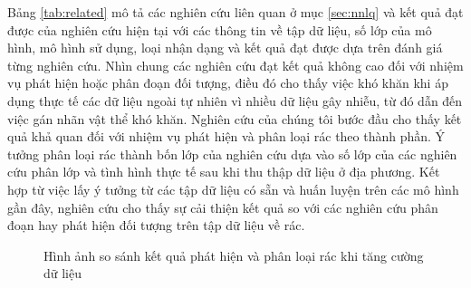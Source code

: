 \documentclass[../the.tex]{subfiles}
\begin{document}
{\fontsize{13}{12} \selectfont

Bảng \ref{tab:related}
mô tả các nghiên cứu liên quan ở mục \ref{sec:nnlq} và kết quả đạt được của nghiên cứu hiện tại với các thông tin về tập dữ liệu, số lớp của mô hình, mô hình sử dụng, loại nhận dạng và kết quả đạt được dựa trên đánh giá từng nghiên cứu.
Nhìn chung các nghiên cứu đạt kết quả không cao đối với nhiệm vụ phát hiện hoặc phân đoạn đối tượng, điều đó cho thấy việc khó khăn khi áp dụng thực tế các dữ liệu ngoài tự nhiên vì nhiều dữ liệu gây nhiễu,
từ đó dẫn đến việc gán nhãn vật thể khó khăn.
Nghiên cứu của chúng tôi bước đầu cho thấy kết quả khả quan đối với nhiệm vụ phát hiện và phân loại rác theo thành phần.
Ý tưởng phân loại rác thành bốn lớp của nghiên cứu dựa vào số lớp của các nghiên cứu phân lớp và tình hình thực tế sau khi thu thập dữ liệu ở địa phương. Kết hợp từ việc lấy ý tưởng từ các tập dữ liệu có sẵn và huấn luyện trên các mô hình gần đây,
nghiên cứu cho thấy sự cải thiện kết quả so với các nghiên cứu phân đoạn hay phát hiện đối tượng trên tập dữ liệu về rác.

}


\begin{figure}[H]
    \centering
    \qquad
    \qquad
    \caption{Hình ảnh so sánh kết quả phát hiện và phân loại rác khi tăng cường dữ liệu}
    \label{fig:final}
\end{figure}
\end{document}
